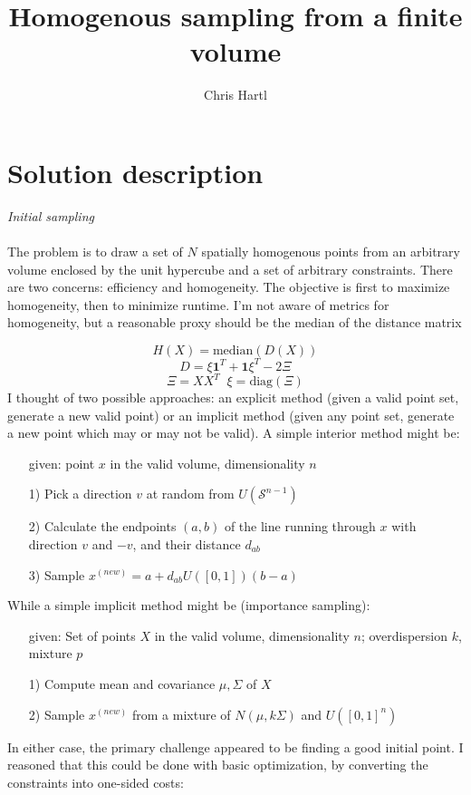\documentclass{article}
\title{Homogenous sampling from a finite volume}
\author{Chris Hartl}
\begin{document}
\maketitle

\section*{Solution description}

\textit{Initial sampling}\\ \\
The problem is to draw a set of $N$ spatially homogenous points from an arbitrary volume enclosed by the unit hypercube and a set of arbitrary constraints.  There are two concerns: efficiency and homogeneity. The objective is first to maximize homogeneity, then to minimize runtime. I'm not aware of metrics for homogeneity, but a reasonable proxy should be the median of the distance matrix

$$H(X) = \mathrm{median}(D(X))$$
$$D = \xi \mathbf{1}^T + \mathbf{1}\xi^T - 2\Xi$$
$$\Xi = XX^T \;\; \xi = \mathrm{diag}(\Xi)$$
I thought of two possible approaches: an explicit method (given a valid point set, generate a new valid point) or an implicit method (given any point set, generate a new point which may or may not be valid). A simple interior method might be:

\begin{itemize}
\item[given:] point $x$ in the valid volume, dimensionality $n$
\item[1)] Pick a direction $v$ at random from $U(\mathcal{S}^{n-1})$
\item[2)] Calculate the endpoints $(a, b)$ of the line running through $x$ with direction $v$ and $-v$, and their distance $d_{ab}$
\item[3)] Sample $x^{(new)} = a + d_{ab}U([0, 1])(b-a)$
\end{itemize}

While a simple implicit method might be (importance sampling):
\begin{itemize}
\item[given:] Set of points $X$ in the valid volume, dimensionality $n$; overdispersion $k$, mixture $p$
\item[1)] Compute mean and covariance $\mu, \Sigma$ of $X$
\item[2)] Sample $x^{(new)}$ from a mixture of $N(\mu, k\Sigma)$ and $U([0,1]^n)$
\end{itemize}
In either case, the primary challenge appeared to be finding a good initial point. I reasoned that this could be done with basic optimization, by converting the constraints into one-sided costs:
\end{document}
